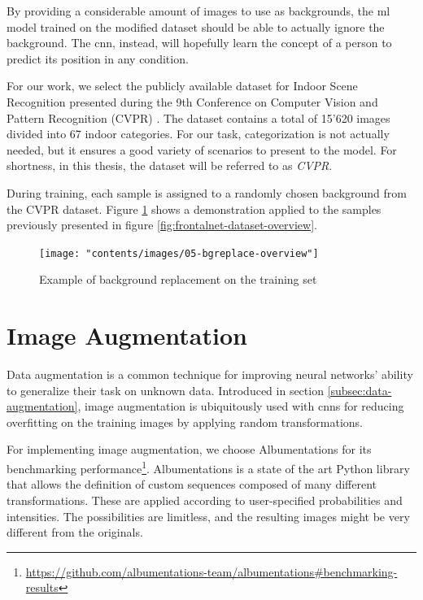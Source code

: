 By providing a considerable amount of images to use as backgrounds, the \gls{ml} model trained on the modified dataset should be able to actually ignore the background. The \gls{cnn}, instead, will hopefully learn the concept of a person to predict its position in any condition.

\medskip

For our work, we select the publicly available dataset for Indoor Scene Recognition presented during the 9th Conference on Computer Vision and Pattern Recognition (CVPR) \cite{cvpr09}. The dataset contains a total of 15'620 images divided into 67 indoor categories. For our task, categorization is not actually needed, but it ensures a good variety of scenarios to present to the model. For shortness, in this thesis, the dataset will be referred to as \textit{CVPR}.

During training, each sample is assigned to a randomly chosen background from the CVPR dataset. Figure \ref{fig:bgreplace-example} shows a demonstration applied to the samples previously presented in figure \ref{fig:frontalnet-dataset-overview}. 

\vspace*{5ex}
\begin{figure}[!h]
	\centering
	\texttt{[image: "contents/images/05-bgreplace-overview"]}
	\caption[Example of background replacement on the training set]{Example of background replacement on the training set}
	\label{fig:bgreplace-example}
\end{figure}
\clearpage




\section{Image Augmentation}
\label{sec:implementation-imgaug}

Data augmentation is a common technique for improving neural networks' ability to generalize their task on unknown data. Introduced in section \ref{subsec:data-augmentation}, image augmentation is ubiquitously used with \gls{cnn}s for reducing overfitting on the training images by applying random transformations.

For implementing image augmentation, we choose Albumentations \cite{Buslaev_2020} for its benchmarking performance\footnote{\url{https://github.com/albumentations-team/albumentations\#benchmarking-results}}. Albumentations is a state of the art Python library that allows the definition of custom sequences composed of many different transformations. These are applied according to user-specified probabilities and intensities. The possibilities are limitless, and the resulting images might be very different from the originals.

